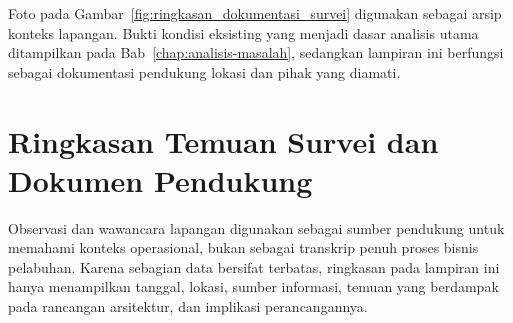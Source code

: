Foto pada Gambar~\ref{fig:ringkasan_dokumentasi_survei} digunakan sebagai
arsip konteks lapangan. Bukti kondisi eksisting yang menjadi dasar analisis
utama ditampilkan pada Bab~\ref{chap:analisis-masalah}, sedangkan lampiran ini
berfungsi sebagai dokumentasi pendukung lokasi dan pihak yang diamati.

\section{Ringkasan Temuan Survei dan Dokumen Pendukung}
\label{sec:temuan_survei}
\label{sec:ringkasan_wawancara}

Observasi dan wawancara lapangan digunakan sebagai sumber pendukung untuk
memahami konteks operasional, bukan sebagai transkrip penuh proses bisnis
pelabuhan. Karena sebagian data bersifat terbatas, ringkasan pada lampiran ini
hanya menampilkan tanggal, lokasi, sumber informasi, temuan yang berdampak pada
rancangan arsitektur, dan implikasi perancangannya.

